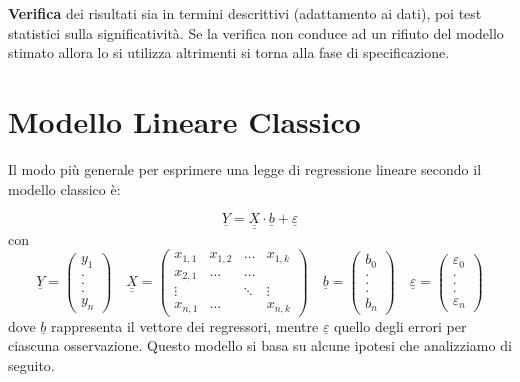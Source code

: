 \documentclass[]{article}
\def\doubleunderline#1{\underline{\underline{#1}}}
\begin{document}
\textbf{Verifica} dei risultati sia in termini descrittivi (adattamento
ai dati), poi test statistici sulla significatività. Se la verifica non
conduce ad un rifiuto del modello stimato allora lo si utilizza
altrimenti si torna alla fase di specificazione.

\section{Modello Lineare Classico}\label{modello-lineare-classico}
Il modo più generale per esprimere una legge di regressione lineare secondo il modello classico è:

\begin{equation}
\underline{Y} = \doubleunderline{X} \cdot \underline{b} + \underline{\varepsilon}
\end{equation}
con
\begin{equation}
\underline{Y} = 
\begin{pmatrix}
y_1 \\ 
. \\ 
. \\ 
. \\ 
y_n
\end{pmatrix}
\quad
\doubleunderline{X} = \begin{pmatrix}
x_{1,1} & x_{1,2} & \dots & x_{1,k} \\ 
x_{2,1} & \dots & \dots &  \\ 
\vdots &  & \ddots & \vdots \\ 
x_{n,1} & \dots &  & x_{n,k}
\end{pmatrix} 
\quad
\underline{b} = \begin{pmatrix}
b_0 \\ 
. \\ 
. \\ 
. \\ 
b_n
\end{pmatrix} 
\quad
\underline{\varepsilon} = \begin{pmatrix}
\varepsilon_0 \\ 
. \\ 
. \\ 
. \\ 
\varepsilon_n
\end{pmatrix} 
\end{equation}
dove $\underline{b}$ rappresenta il vettore dei regressori, mentre $\underline{\varepsilon}$ quello degli errori per ciascuna osservazione. Questo modello si basa su alcune ipotesi che analizziamo di seguito.
\end{document}
